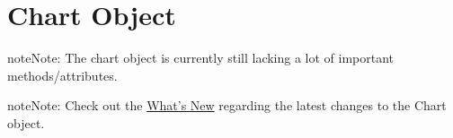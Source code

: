 \documentclass[letterpaper,11pt,english]{sphinxmanual}
\begin{document}
\chapter{Chart Object}
\label{chart:chart-object}\label{chart::doc}
\begin{notice}{note}{Note:}
The chart object is currently still lacking a lot of important methods/attributes.
\end{notice}

\begin{notice}{note}{Note:}
Check out the \href{http://docs.xlwings.org/whatsnew.html\#v0-1-1-june-27-2014}{What's New} regarding
the latest changes to the Chart object.
\end{notice}
\label{chart:module-xlwings}
\end{document}
